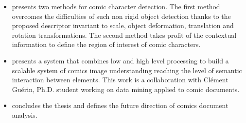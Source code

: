 \begin{itemize}
\item {} presents two methods for comic character detection.
The first method overcomes the difficulties of such non rigid object detection thanks to the proposed descriptor invariant to scale, object deformation, translation and rotation transformations.
The second method takes profit of the contextual information to define the region of interest of comic characters.%

\item {} presents a system that combines low and high level processing to build a scalable system of comics image understanding reaching the level of semantic interaction between elements.
This work is a collaboration with Cl{\'e}ment Gu{\'e}rin, Ph.D. student working on data mining applied to comic documents.

\item {} concludes the thesis and defines the future direction of comics document analysis.

\end{itemize}

